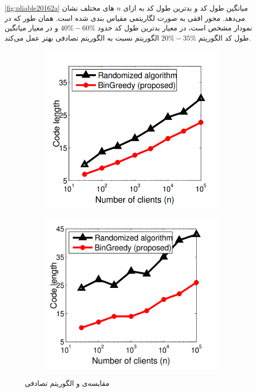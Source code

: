 \autoref{fig:pliable20162a}
میانگین طول کد و بدترین طول کد به ازای
$n$
های مختلف نشان می‌دهد. محور افقی به صورت لگاریتمی مقیاس بندی شده است. همان طور که در نمودار مشخص است، در معیار بدترین طول کد حدود
$40\%-60\%$
و در معیار میانگین طول کد الگوریتم
$20\%-35\%$
الگوریتم
نسبت به الگوریتم تصادفی بهتر عمل می‌کند.
  \begin{figure}
	\centering
	\begin{subfigure}[b]{0.45\textwidth}
		\centering
			\includegraphics[width=1\linewidth]{figs/ch3/pliable2016_2a}
			\caption{}
			\label{fig:pliable20162a}
		\end{subfigure}
		\hfill
	\begin{subfigure}[b]{0.45\textwidth}
	\centering
	\includegraphics[width=1\linewidth]{figs/ch3/pliable2016_2b}
	\caption{
	}
	\label{fig:pliable20162b}
		\end{subfigure}
		\caption{
			مقایسه‌ی
			و الگوریتم تصادفی
			}
\end{figure}

